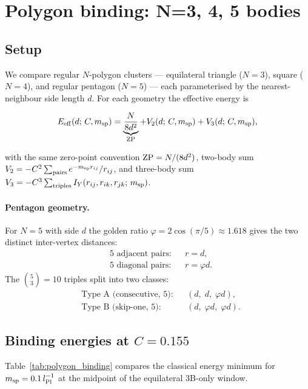 \section{Polygon binding: N=3, 4, 5 bodies}
\label{sec:polygon_geometry}

\subsection{Setup}

We compare regular $N$-polygon clusters — equilateral triangle ($N=3$),
square ($N=4$), and regular pentagon ($N=5$) — each parameterised by the
nearest-neighbour side length $d$.  For each geometry the effective energy is

\begin{equation}
  E_{\rm eff}(d;\,C,m_{\rm sp}) = \underbrace{\frac{N}{8d^2}}_{\rm ZP}
  + V_2(d;\,C,m_{\rm sp})
  + V_3(d;\,C,m_{\rm sp}),
\end{equation}

with the same zero-point convention ${\rm ZP}=N/(8d^2)$,
two-body sum $V_2 = -C^2\sum_{\rm pairs} e^{-m_{\rm sp}r_{ij}}/r_{ij}$,
and three-body sum $V_3 = -C^3\sum_{\rm triples} I_Y(r_{ij},r_{ik},r_{jk};\,m_{\rm sp})$.

\paragraph{Pentagon geometry.}
For $N=5$ with side $d$ the golden ratio $\varphi = 2\cos(\pi/5)\approx1.618$
gives the two distinct inter-vertex distances:
\begin{align}
  &\text{5 adjacent pairs:}&&r = d, \\
  &\text{5 diagonal pairs:} &&r = \varphi d.
\end{align}
The $\binom{5}{3}=10$ triples split into two classes:
\begin{align}
  &\text{Type A (consecutive, 5):}&&(d,\;d,\;\varphi d), \\
  &\text{Type B (skip-one, 5):}   &&(d,\;\varphi d,\;\varphi d).
\end{align}

\subsection{Binding energies at \texorpdfstring{$C=0.155$}{C=0.155}}

Table~\ref{tab:polygon_binding} compares the classical energy minimum
for $m_{\rm sp}=0.1\,l_{\rm Pl}^{-1}$ at the midpoint of the equilateral
3B-only window.

